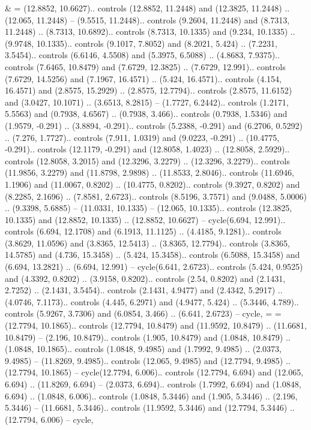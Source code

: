 {&} = {(12.8852, 10.6627).. controls (12.8852, 11.2448) and (12.3825, 11.2448) .. (12.065, 11.2448) -- (9.5515, 11.2448).. controls (9.2604, 11.2448) and (8.7313, 11.2448) .. (8.7313, 10.6892).. controls (8.7313, 10.1335) and (9.234, 10.1335) .. (9.9748, 10.1335).. controls (9.1017, 7.8052) and (8.2021, 5.424) .. (7.2231, 3.5454).. controls (6.6146, 4.5508) and (5.3975, 6.5088) .. (4.8683, 7.9375).. controls (7.6465, 10.8479) and (7.6729, 12.3825) .. (7.6729, 12.991).. controls (7.6729, 14.5256) and (7.1967, 16.4571) .. (5.424, 16.4571).. controls (4.154, 16.4571) and (2.8575, 15.2929) .. (2.8575, 12.7794).. controls (2.8575, 11.6152) and (3.0427, 10.1071) .. (3.6513, 8.2815) -- (1.7727, 6.2442).. controls (1.2171, 5.5563) and (0.7938, 4.6567) .. (0.7938, 3.466).. controls (0.7938, 1.5346) and (1.9579, -0.291) .. (3.8894, -0.291).. controls (5.2388, -0.291) and (6.2706, 0.5292) .. (7.276, 1.7727).. controls (7.911, 1.0319) and (9.0223, -0.291) .. (10.4775, -0.291).. controls (12.1179, -0.291) and (12.8058, 1.4023) .. (12.8058, 2.5929).. controls (12.8058, 3.2015) and (12.3296, 3.2279) .. (12.3296, 3.2279).. controls (11.9856, 3.2279) and (11.8798, 2.9898) .. (11.8533, 2.8046).. controls (11.6946, 1.1906) and (11.0067, 0.8202) .. (10.4775, 0.8202).. controls (9.3927, 0.8202) and (8.2285, 2.1696) .. (7.8581, 2.6723).. controls (8.5196, 3.7571) and (9.0488, 5.0006) .. (9.3398, 5.6885) -- (11.0331, 10.1335) -- (12.065, 10.1335).. controls (12.3825, 10.1335) and (12.8852, 10.1335) .. (12.8852, 10.6627) -- cycle(6.694, 12.991).. controls (6.694, 12.1708) and (6.1913, 11.1125) .. (4.4185, 9.1281).. controls (3.8629, 11.0596) and (3.8365, 12.5413) .. (3.8365, 12.7794).. controls (3.8365, 14.5785) and (4.736, 15.3458) .. (5.424, 15.3458).. controls (6.5088, 15.3458) and (6.694, 13.2821) .. (6.694, 12.991) -- cycle(6.641, 2.6723).. controls (5.424, 0.9525) and (4.3392, 0.8202) .. (3.9158, 0.8202).. controls (2.54, 0.8202) and (2.1431, 2.7252) .. (2.1431, 3.5454).. controls (2.1431, 4.9477) and (2.4342, 5.2917) .. (4.0746, 7.1173).. controls (4.445, 6.2971) and (4.9477, 5.424) .. (5.3446, 4.789).. controls (5.9267, 3.7306) and (6.0854, 3.466) .. (6.641, 2.6723) -- cycle},
{=} = {(12.7794, 10.1865).. controls (12.7794, 10.8479) and (11.9592, 10.8479) .. (11.6681, 10.8479) -- (2.196, 10.8479).. controls (1.905, 10.8479) and (1.0848, 10.8479) .. (1.0848, 10.1865).. controls (1.0848, 9.4985) and (1.7992, 9.4985) .. (2.0373, 9.4985) -- (11.8269, 9.4985).. controls (12.065, 9.4985) and (12.7794, 9.4985) .. (12.7794, 10.1865) -- cycle(12.7794, 6.006).. controls (12.7794, 6.694) and (12.065, 6.694) .. (11.8269, 6.694) -- (2.0373, 6.694).. controls (1.7992, 6.694) and (1.0848, 6.694) .. (1.0848, 6.006).. controls (1.0848, 5.3446) and (1.905, 5.3446) .. (2.196, 5.3446) -- (11.6681, 5.3446).. controls (11.9592, 5.3446) and (12.7794, 5.3446) .. (12.7794, 6.006) -- cycle},
